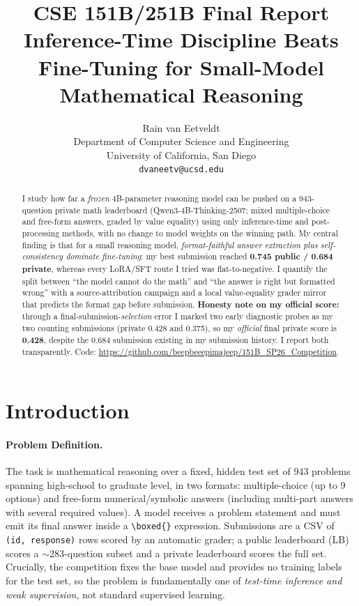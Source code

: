 \documentclass{article}
\title{
CSE 151B/251B Final Report\\
\large Inference-Time Discipline Beats Fine-Tuning for Small-Model Mathematical Reasoning
}
\author{%
  Rain van Eetveldt \\
  Department of Computer Science and Engineering\\
  University of California, San Diego\\
  \texttt{dvaneetv@ucsd.edu} \\
}
\begin{document}
\maketitle

\begin{abstract}
I study how far a \emph{frozen} 4B-parameter reasoning model can be pushed on a
943-question private math leaderboard (Qwen3-4B-Thinking-2507; mixed
multiple-choice and free-form answers, graded by value equality) using only
inference-time and post-processing methods, with no change to model weights on the
winning path. My central finding is that for a small reasoning model, \emph{format-faithful
answer extraction plus self-consistency dominate fine-tuning}: my best
submission reached \textbf{0.745 public / 0.684 private}, whereas every LoRA/SFT route I tried was flat-to-negative. I quantify the split between
``the model cannot do the math'' and ``the answer is right but formatted wrong''
with a source-attribution campaign and a local value-equality grader mirror that
predicts the format gap before submission. \textbf{Honesty note on my official score:}
through a final-submission-\emph{selection} error I marked two early diagnostic
probes as my two counting submissions (private 0.428 and 0.375), so my
\emph{official} final private score is \textbf{0.428}, despite the 0.684 submission
existing in my submission history. I report both transparently. Code:
\url{https://github.com/beepbeeepimajeep/151B_SP26_Competition}.
\end{abstract}

\section{Introduction}
\label{sec:intro}

\paragraph{Problem Definition.}
The task is mathematical reasoning over a fixed, hidden test set of 943 problems
spanning high-school to graduate level, in two formats: multiple-choice (up to 9
options) and free-form numerical/symbolic answers (including multi-part answers
with several required values). A model receives a problem statement and must emit
its final answer inside a \texttt{\textbackslash boxed\{\}} expression. Submissions
are a CSV of \texttt{(id, response)} rows scored by an automatic grader; a public
leaderboard (LB) scores a $\sim$283-question subset and a private leaderboard scores
the full set. Crucially, the competition fixes the base model and provides no
training labels for the test set, so the problem is fundamentally one of
\emph{test-time inference and weak supervision}, not standard supervised learning.
\end{document}

